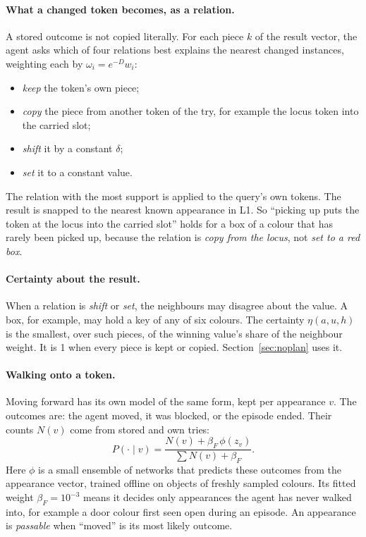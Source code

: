 \documentclass{article}
\begin{document}
\paragraph{What a changed token becomes, as a relation.} A stored outcome is not copied literally. For each piece $k$ of the result vector, the agent asks which of four relations best explains the nearest changed instances, weighting each by $\omega_i=e^{-D}w_i$:
\begin{itemize}
    \item \emph{keep} the token's own piece;
    \item \emph{copy} the piece from another token of the try, for example the locus token into the carried slot;
    \item \emph{shift} it by a constant $\delta$;
    \item \emph{set} it to a constant value.
\end{itemize}
The relation with the most support is applied to the query's own tokens. The result is snapped to the nearest known appearance in L1. So ``picking up puts the token at the locus into the carried slot'' holds for a box of a colour that has rarely been picked up, because the relation is \emph{copy from the locus}, not \emph{set to a red box}.

\paragraph{Certainty about the result.} When a relation is \emph{shift} or \emph{set}, the neighbours may disagree about the value. A box, for example, may hold a key of any of six colours. The certainty $\eta(a,u,h)$ is the smallest, over such pieces, of the winning value's share of the neighbour weight. It is 1 when every piece is kept or copied. Section~\ref{sec:noplan} uses it.

\paragraph{Walking onto a token.} Moving forward has its own model of the same form, kept per appearance $v$. The outcomes are: the agent moved, it was blocked, or the episode ended. Their counts $N(v)$ come from stored and own tries:
\begin{equation} \label{eq:walk}
    P(\cdot\mid v) = \frac{N(v) + \beta_F\,\phi(z_v)}{\sum N(v) + \beta_F}.
\end{equation}
Here $\phi$ is a small ensemble of networks that predicts these outcomes from the appearance vector, trained offline on objects of freshly sampled colours. Its fitted weight $\beta_F=10^{-3}$ means it decides only appearances the agent has never walked into, for example a door colour first seen open during an episode. An appearance is \emph{passable} when ``moved'' is its most likely outcome.
\end{document}
